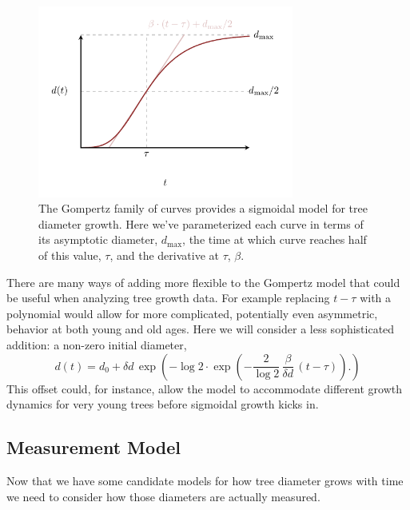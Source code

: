 \documentclass[
  letterpaper,
  DIV=11,
  numbers=noendperiod]{scrartcl}
\begin{document}
\begin{figure}

{\centering \includegraphics[width=0.75\textwidth,height=\textheight]{figures/growth/gompertz/gompertz.pdf}

}

\caption{\label{fig-gompertz}The Gompertz family of curves provides a
sigmoidal model for tree diameter growth. Here we've parameterized each
curve in terms of its asymptotic diameter, \(d_{\max}\), the time at
which curve reaches half of this value, \(\tau\), and the derivative at
\(\tau\), \(\beta\).}

\end{figure}

There are many ways of adding more flexible to the Gompertz model that
could be useful when analyzing tree growth data. For example replacing
\(t - \tau\) with a polynomial would allow for more complicated,
potentially even asymmetric, behavior at both young and old ages. Here
we will consider a less sophisticated addition: a non-zero initial
diameter, \[
d(t) = d_{0} + \delta d \,
\exp \left( -\log 2 \cdot
\exp \left( -\frac{2}{\log 2} \, \frac{\beta}{\delta d} \,
             \left( t - \tau \right) \right).
\right)
\] This offset could, for instance, allow the model to accommodate
different growth dynamics for very young trees before sigmoidal growth
kicks in.

\hypertarget{measurement-model}{%
\subsection{Measurement Model}\label{measurement-model}}

Now that we have some candidate models for how tree diameter grows with
time we need to consider how those diameters are actually measured.
\end{document}
